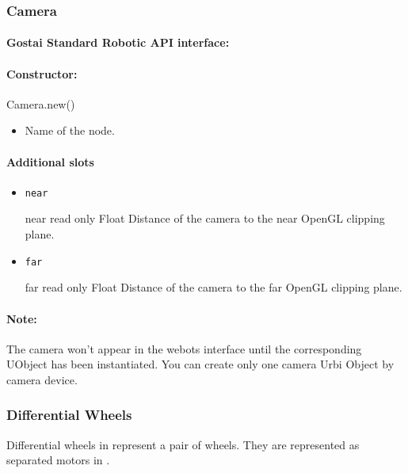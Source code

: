 \subsubsection{Camera}

\paragraph{Gostai Standard Robotic API interface:} 

\paragraph{Constructor: } Camera.new()

\begin{itemize}
\item {} Name of the \webots node.
\end{itemize}

\paragraph{Additional slots}

\begin{itemize}
\item \lstinline{near}
\begin{attribute}{near}
  {read only}
  {Float}
  {}
  Distance of the camera to the near OpenGL clipping
  plane.
\end{attribute}

\item \lstinline|far|
\begin{attribute}{far}
  {read only}
  {Float}
  {}
  Distance of the camera to the far OpenGL clipping
  plane.
\end{attribute}
\end{itemize}

\paragraph{Note:} The \webots camera won't appear in the webots interface until the
corresponding UObject has been instantiated. You can create only one
camera Urbi Object by \webots camera device.

\subsubsection{Differential Wheels}

Differential wheels in \webots represent a pair of wheels. They are
represented as separated motors in \urbi.

